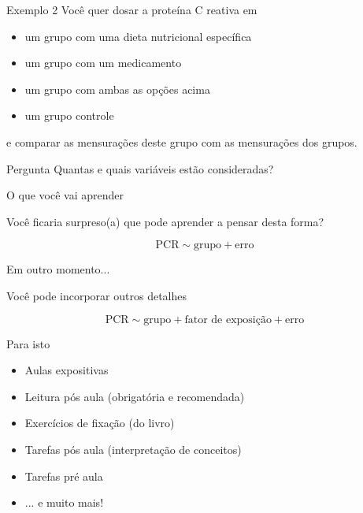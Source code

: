 \documentclass{beamer}
\begin{document}
\begin{frame}{\scriptsize }
  \begin{exampleblock}{Exemplo 2}
    \footnotesize
    Você quer dosar a proteína C reativa em
    \begin{itemize}
    \footnotesize
    \item um grupo com uma dieta nutricional específica
    \item um grupo com um medicamento
    \item um grupo com ambas as opções acima
    \item um grupo controle
    \end{itemize}
    e comparar as mensurações deste grupo com as mensurações dos grupos.
  \end{exampleblock}
  \begin{block}{Pergunta}
    \footnotesize
    Quantas e quais variáveis estão consideradas?
  \end{block}
\end{frame}

\begin{frame}{\scriptsize O que você vai aprender}
  \begin{block}{}
    \footnotesize
    Você ficaria surpreso(a) que pode aprender a pensar desta forma?
  \end{block}

  $$\text{PCR} \sim \text{grupo} + \text{erro}$$
\end{frame}

\begin{frame}{\scriptsize Em outro momento...}
  \begin{block}{}
    \footnotesize
    Você pode incorporar outros detalhes
  \end{block}

  $$\text{PCR} \sim \text{grupo} + \text{fator de exposição} + \text{erro}$$
\end{frame}

\begin{frame}{\scriptsize Para isto}
  \begin{itemize}
    \footnotesize
  \item Aulas expositivas
  \item Leitura pós aula (obrigatória e recomendada)
  \item Exercícios de fixação (do livro)
  \item Tarefas pós aula (interpretação de conceitos)
  \item Tarefas pré aula
  \item ... e muito mais!
  \end{itemize}
\end{frame}
\end{document}
